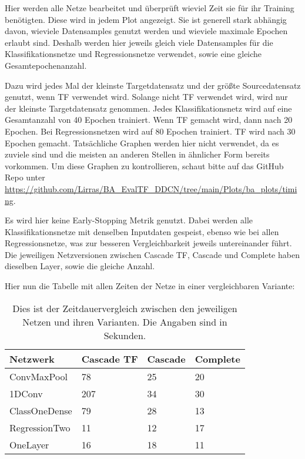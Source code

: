 Hier werden alle Netze bearbeitet und überprüft wieviel Zeit sie für ihr Training benötigten. 
Diese wird in jedem Plot angezeigt. Sie ist generell stark abhängig davon, wieviele Datensamples genutzt werden und 
wieviele maximale Epochen erlaubt sind. Deshalb werden hier jeweils gleich viele Datensamples für die Klassifikationsnetze und 
Regressionsnetze verwendet, sowie eine gleiche Gesamtepochenanzahl. 

Dazu wird jedes Mal der kleinste Targetdatensatz und der größte Sourcedatensatz genutzt, wenn TF verwendet wird. 
Solange nicht TF verwendet wird, wird nur der kleinste Targetdatensatz genommen. Jedes Klassifikationsnetz 
wird auf eine Gesamtanzahl von 40 Epochen trainiert. Wenn TF gemacht wird, dann nach 20 Epochen. Bei Regressionsnetzen wird auf 80 Epochen 
trainiert. TF wird nach 30 Epochen gemacht. Tatsächliche Graphen werden hier nicht verwendet, da es zuviele sind und die meisten an 
anderen Stellen in ähnlicher Form bereits vorkommen. Um diese Graphen zu kontrollieren, schaut bitte auf das GitHub Repo unter 
\url{https://github.com/Lirras/BA_EvalTF_DDCN/tree/main/Plots/ba_plots/timing}. 

Es wird hier keine Early-Stopping Metrik genutzt. 
Dabei werden alle Klassifikationsnetze mit denselben Inputdaten gespeist, ebenso wie bei allen Regressionsnetze, was zur besseren 
Vergleichbarkeit jeweils untereinander führt. 
Die jeweiligen Netzversionen zwischen Cascade TF, Cascade und Complete haben dieselben Layer, sowie die gleiche Anzahl. 

Hier nun die Tabelle mit allen Zeiten der Netze in einer vergleichbaren Variante: \newline

\begin{table}[h!]
    \begin{center} 
        \begin{tabular}{l|l|l|l}
            \textbf{Netzwerk} & \textbf{Cascade TF} & \textbf{Cascade} & \textbf{Complete} \\
            \hline
            ConvMaxPool & 78 & 25 & 20 \\
            1DConv & 207 & 34 & 30 \\
            ClassOneDense & 79 & 28 & 13 \\
            RegressionTwo & 11 & 12 & 17 \\
            OneLayer & 16 & 18 & 11
        \end{tabular}
        \caption{
            \small{Dies ist der Zeitdauervergleich zwischen den jeweiligen Netzen und ihren Varianten. Die Angaben sind in Sekunden.}}
        \label{tab:time}
    \end{center}
\end{table}

